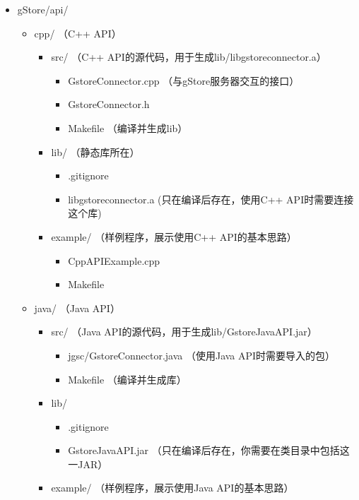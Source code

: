 \documentclass[titlepage, a4paper, 12pt]{article}
\begin{document}
\begin{itemize}
	\item
	gStore/api/
	
	\begin{itemize}
		\item
		cpp/ （C++ API）
		
		\begin{itemize}
			\item
			src/ （C++ API的源代码，用于生成lib/libgstoreconnector.a）
			\begin{itemize}
				\item
				GstoreConnector.cpp （与gStore服务器交互的接口）
				\item
				GstoreConnector.h
				\item
				Makefile （编译并生成lib）
			\end{itemize}
			\item
			lib/ （静态库所在）
			
			\begin{itemize}
				\item
				.gitignore
				\item
				libgstoreconnector.a (只在编译后存在，使用C++ API时需要连接这个库)
			\end{itemize}
			\item
			example/ （样例程序，展示使用C++ API的基本思路）
			
			\begin{itemize}
				\item
				CppAPIExample.cpp
				\item
				Makefile
			\end{itemize}
		\end{itemize}
		\item
		java/ （Java API）
		
		\begin{itemize}
			\item
			src/ （Java API的源代码，用于生成lib/GstoreJavaAPI.jar）
			
			\begin{itemize}
				\item
				jgsc/GstoreConnector.java （使用Java API时需要导入的包）
				\item
				Makefile （编译并生成库）
			\end{itemize}
			\item
			lib/
			
			\begin{itemize}
				\item
				.gitignore
				\item
				GstoreJavaAPI.jar （只在编译后存在，你需要在类目录中包括这一JAR）
			\end{itemize}
			\item
			example/ （样例程序，展示使用Java API的基本思路）
			

\end{itemize}
\end{itemize}
\end{itemize}
\end{document}
